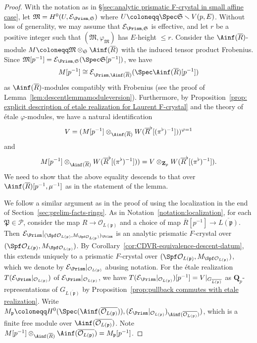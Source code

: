 \begin{proof}
With the notation as in \S\ref{sec:analytic prismatic F-crystal in small affine case}, let $\mathfrak{M} = H^0(U, \mathcal{E}_{\Prism,\mathfrak{S}})$ where $U \coloneqq \Spec\mathfrak{S} \smallsetminus V(p, E)$. Without loss of generality, we may assume that $\mathcal{E}_{\Prism,\mathfrak{S}}$ is effective, and let $r$ be a positive integer such that $(\mathfrak{M}, \varphi_{\mathfrak{M}})$ has $E$-height $\leq r$. Consider the $\Ainf(\overline{R})$-module $M \coloneqq \mathfrak{M}\otimes_{\mathfrak{S}} \Ainf(\overline{R})$ with the induced tensor product Frobenius. Since $\mathfrak{M}[p^{-1}] = \mathcal{E}_{\Prism,\mathfrak{S}}(\Spec \mathfrak{S}[p^{-1}])$, we have
\[
M[p^{-1}] \cong \mathcal{E}_{\Prism,\Ainf(\overline{R})}(\Spec\Ainf(\overline{R})[p^{-1}])
\]
as $\Ainf(\overline{R})$-modules compatibly with Frobenius (see the proof of Lemma~\ref{lem:descentlemmamoduleversion}). Furthermore, by Proposition~\ref{prop: explicit description of etale realization for Laurent F-crystal} and the theory of \'etale $\varphi$-modules, we have a natural identification
\[
V = (M[p^{-1}]\otimes_{\Ainf(\overline{R})} W(\overline{R}^\flat[(\pi^{\flat})^{-1}]))^{\varphi = 1}
\]
and
\[
M[p^{-1}]\otimes_{\Ainf(\overline{R})} W(\overline{R}^\flat[(\pi^{\flat})^{-1}])) = V\otimes_{\mathbf{Z}_p} W(\overline{R}^\flat[(\pi^{\flat})^{-1}]).
\]
We need to show that the above equality descends to that over $\Ainf(\overline{R})[p^{-1}, \mu^{-1}]$ as in the statement of the lemma.

We follow a similar argument as in the proof of \cite[Thm.~3.29(i)]{du-liu-moon-shimizu-completed-prismatic-F-crystal-loc-system} using the localization in the end of Section~\ref{sec:prelim-facts-rings}. As in Notation~\ref{notation:localization}, for each $\mathfrak{P} \in \mathcal{P}$, consider the map $R \rightarrow \mathcal{O}_{L(\mathfrak{p})}$ and a choice of map $\overline{R}[p^{-1}] \rightarrow \overline{L(\mathfrak{p})}$. Then $\mathcal{E}_\Prism|_{(\Spf \mathcal{O}_{L(\mathfrak{p})}, M_{\Spf \mathcal{O}_{L(\mathfrak{p}})})_{\Prism}}$ is an analytic prismatic $F$-crystal over $(\Spf \mathcal{O}_{L(\mathfrak{p})}, M_{\Spf \mathcal{O}_{L(\mathfrak{p})}})$. By Corollary~\ref{cor:CDVR-equivalence-descent-datum}, this extends uniquely to a prismatic $F$-crystal over $(\Spf \mathcal{O}_{L(\mathfrak{p})}, M_{\Spf \mathcal{O}_{L(\mathfrak{p})}})$, which we denote by $\mathcal{E}_\Prism|_{\mathcal{O}_{L(\mathfrak{p})}}$ abusing notation. For the \'etale realization $T(\mathcal{E}_\Prism|_{\mathcal{O}_{L(\mathfrak{p})}})$ of $\mathcal{E} _\Prism|_{\mathcal{O}_{L(\mathfrak{p})}}$, we have $T(\mathcal{E}_\Prism|_{\mathcal{O}_{L(\mathfrak{p})}})[p^{-1}] = V|_{G_{\overline{L(\mathfrak{p})}}}$ as $\mathbf{Q}_p$-representations of $G_{\overline{L(\mathfrak{p})}}$ by Proposition~\ref{prop:pullback commutes with etale realization}. Write $M_{\mathfrak{p}} \coloneqq H^0(\Spec(\Ainf(\overline{\mathcal{O}_{L(\mathfrak{p})}})),(\mathcal{E}_\Prism|_{\mathcal{O}_{L(\mathfrak{p})}})_{\Ainf(\overline{\mathcal{O}_{L(\mathfrak{p})}})})$, which is a finite free module over $\Ainf(\overline{\mathcal{O}_{L(\mathfrak{p})}})$. Note $M[p^{-1}]\otimes_{\Ainf(\overline{R})} \Ainf(\overline{\mathcal{O}_{L(\mathfrak{p})}}) = M_{\mathfrak{p}}[p^{-1}]$.


\end{proof}

